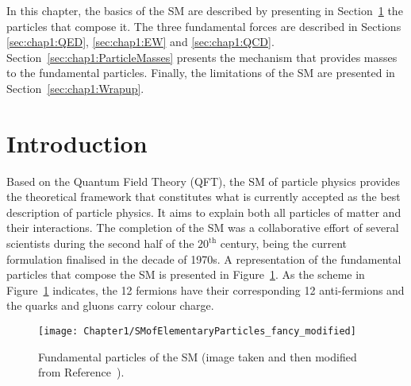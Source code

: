 
In this chapter, the basics of the SM are described by presenting 
in Section~\ref{sec:chap1:SM_and_EParticles} the particles that compose it. 
The three fundamental forces are described in Sections \ref{sec:chap1:QED}, \ref{sec:chap1:EW}
and \ref{sec:chap1:QCD}. Section~\ref{sec:chap1:ParticleMasses} presents the
mechanism that provides masses to the fundamental particles. 
Finally, the limitations of the SM are presented in Section~\ref{sec:chap1:Wrapup}.

\section{Introduction}
\label{sec:chap1:SM_and_EParticles}
Based on the Quantum Field Theory (QFT), the SM of particle physics provides the theoretical framework that constitutes what is 
currently accepted as the best description of particle physics. It aims to explain both all particles of matter and
 their interactions. The completion of the SM was a collaborative effort of several scientists during the second half of the
$20^\text{th}$ century, being the current formulation finalised in the decade of 1970s. A representation of the fundamental particles 
that compose the SM is presented in Figure~\ref{fig:Chap1:SM}.
 As the scheme in Figure~\ref{fig:Chap1:SM} indicates, the 
12 fermions have their corresponding 12 anti-fermions and the quarks and gluons carry colour charge. 
\begin{figure}
    \centering
    \texttt{[image: Chapter1/SMofElementaryParticles\_fancy\_modified]}
    \caption{Fundamental particles of the SM (image taken and then modified from Reference~\cite{Purcell:1473657}). }
    \label{fig:Chap1:SM}
\end{figure}





